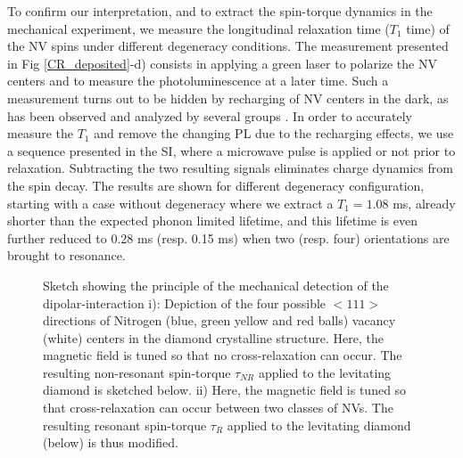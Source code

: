 \documentclass[preprintnumbers,amsmath,amssymb,superscriptaddress,twocolumn,showpacs]{revtex4-1}
\begin{document}
To confirm our interpretation, and to extract the spin-torque dynamics in the mechanical experiment, we measure the longitudinal relaxation time ($T_1$ time) of the NV spins under different degeneracy conditions. %
The measurement presented in Fig \ref{CR_deposited}-d) consists in applying a green laser to polarize the NV centers and to measure the photoluminescence at a later time. 
Such a measurement turns out to be hidden by recharging of NV centers in the dark, as has been observed and analyzed by several groups \cite{choi_depolarization_2017, mrozek_longitudinal_2015, giri_selective_2019, giri_coupled_2018}.
In order to accurately measure the $T_1$ and remove the changing PL due to the recharging effects, we use a sequence presented in the SI, where a microwave pulse is applied or not prior to relaxation. Subtracting the two resulting signals eliminates charge dynamics from the spin decay.
The results are shown for different degeneracy configuration, starting with a case without degeneracy where we extract a $T_1=1.08$ ms, already shorter than the expected phonon limited lifetime, and this lifetime is even further reduced to 0.28 ms (resp. 0.15 ms) when two (resp. four) orientations are brought to resonance.


\begin{figure}[!ht]
  \centering {}
  \caption{Sketch showing the principle of the mechanical detection of the dipolar-interaction i): Depiction of the four possible $<111>$ directions of Nitrogen (blue, green yellow and red balls) vacancy (white) centers in the diamond crystalline structure. Here, the magnetic field is tuned so that no cross-relaxation can occur.
The resulting non-resonant spin-torque $\tau_{NR}$ applied to the levitating diamond is sketched below. 
ii) Here, the magnetic field is tuned so that cross-relaxation can occur between two classes of NVs.
The resulting resonant spin-torque $\tau_{R}$ applied to the levitating diamond (below) is thus modified. 
  }\label{principle}
\end{figure}

%
\end{document}
